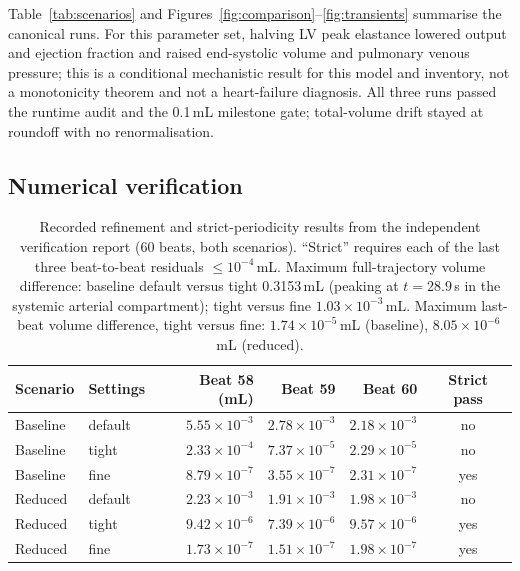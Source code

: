 \documentclass[11pt,letterpaper]{article}
\begin{document}
Table~\ref{tab:scenarios} and Figures~\ref{fig:comparison}--\ref{fig:transients} summarise the canonical runs. For this parameter set, halving LV peak elastance lowered output and ejection fraction and raised end-systolic volume and pulmonary venous pressure; this is a conditional mechanistic result for this model and inventory, not a monotonicity theorem and not a heart-failure diagnosis. All three runs passed the runtime audit and the 0.1\,mL milestone gate; total-volume drift stayed at roundoff with no renormalisation.

\subsection{Numerical verification}

\begin{table}[t]
\centering\small
\caption{Recorded refinement and strict-periodicity results from the independent verification report (60 beats, both scenarios). ``Strict'' requires each of the last three beat-to-beat residuals $\le 10^{-4}$\,mL. Maximum full-trajectory volume difference: baseline default versus tight 0.3153\,mL (peaking at $t=28.9$\,s in the systemic arterial compartment); tight versus fine $1.03\times10^{-3}$\,mL. Maximum last-beat volume difference, tight versus fine: $1.74\times10^{-5}$\,mL (baseline), $8.05\times10^{-6}$\,mL (reduced).}
\label{tab:refine}
\begin{tabular}{llrrrc}
\toprule
Scenario & Settings & Beat 58 (mL) & Beat 59 & Beat 60 & Strict pass \\
\midrule
Baseline & default & $5.55\times10^{-3}$ & $2.78\times10^{-3}$ & $2.18\times10^{-3}$ & no \\
Baseline & tight & $2.33\times10^{-4}$ & $7.37\times10^{-5}$ & $2.29\times10^{-5}$ & no \\
Baseline & fine & $8.79\times10^{-7}$ & $3.55\times10^{-7}$ & $2.31\times10^{-7}$ & yes \\
Reduced & default & $2.23\times10^{-3}$ & $1.91\times10^{-3}$ & $1.98\times10^{-3}$ & no \\
Reduced & tight & $9.42\times10^{-6}$ & $7.39\times10^{-6}$ & $9.57\times10^{-6}$ & yes \\
Reduced & fine & $1.73\times10^{-7}$ & $1.51\times10^{-7}$ & $1.98\times10^{-7}$ & yes \\
\bottomrule
\end{tabular}
\end{table}
\end{document}
